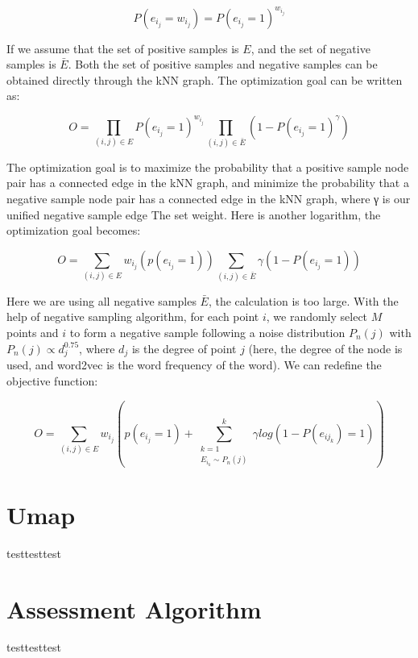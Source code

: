 \begin{equation*}
    P(e_i_j = w_i_j) = P(e_i_j = 1) ^ {w_i_j}
\end{equation*}

\noindent If we assume that the set of positive samples is $E$, and the set of negative samples is $\bar E$. Both the set of positive samples and negative samples can be obtained directly through the kNN graph. The optimization goal can be written as:

\begin{equation*}
    O = \prod_{(i,j)∈E} P(e_i_j = 1) ^ {w_i_j} \prod_{(i,j)∈\bar E} (1 - P(e_i_j = 1) ^ {\gamma}) 
\end{equation*}

\noindent The optimization goal is to maximize the probability that a positive sample node pair has a connected edge in the kNN graph, and minimize the probability that a negative sample node pair has a connected edge in the kNN graph, where γ is our unified negative sample edge The set weight. Here is another logarithm, the optimization goal becomes:

\begin{equation*}
    O =  \sum_{(i,j)∈E}  w_i_j(p(e_i_j = 1)) \sum_{(i,j)∈\bar E} \gamma (1 - P(e_i_j = 1))
\end{equation*}

\noindent Here we are using all negative samples $\bar E$, the calculation is too large. With the help of negative sampling algorithm, for each point $i$, we randomly select $M$ points and $i$ to form a negative sample following a noise distribution $P_n(j)$ with $P_n(j)∝d_j^{0. 75}$, where $d_j$ is the degree of point $j$ (here, the degree of the node is used, and word2vec is the word frequency of the word). We can redefine the objective function:

\begin{equation*}
    O =  \sum_{(i,j)∈E}  w_i_j(p(e_i_j = 1)  +\sum^k_{\substack{k=1\\ {E_{i_k} \sim P_n(j)}}} \gamma log (1 - P(e_{ij_{k}}) = 1))
\end{equation*}

\chapter{Umap}


testtesttest\\

\chapter{Assessment Algorithm}


testtesttest\\